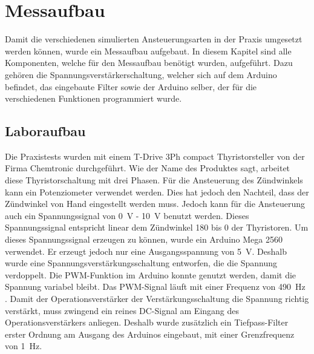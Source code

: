 \section{Messaufbau}
Damit die verschiedenen simulierten Ansteuerungsarten in der Praxis umgesetzt werden können, wurde ein Messaufbau aufgebaut. In diesem Kapitel sind alle Komponenten, welche für den Messaufbau benötigt wurden, aufgeführt. Dazu gehören die Spannungsverstärkerschaltung, welcher sich auf dem Arduino befindet, das eingebaute Filter sowie der Arduino selber, der für die verschiedenen Funktionen programmiert wurde.
\subsection{Laboraufbau}
Die Praxistests wurden mit einem \grqq T-Drive 3Ph compact Thyristorsteller\grqq \hspace{0.02cm} von der Firma Chemtronic durchgeführt. Wie der Name des Produktes sagt, arbeitet diese Thyristorschaltung mit drei Phasen. Für die Ansteuerung des Zündwinkels kann ein Potenziometer verwendet werden. Dies hat jedoch den Nachteil, dass der Zündwinkel von Hand eingestellt werden muss. Jedoch kann für die Ansteuerung auch ein Spannungssignal von \SI{0}{V} - \SI{10}{V} benutzt werden. Dieses Spannungssignal entspricht linear dem Zündwinkel 180\textdegree \hspace{0.02cm} bis 0\textdegree \hspace{0.02cm} der Thyristoren. Um dieses Spannungssignal erzeugen zu können, wurde ein Arduino Mega 2560 verwendet. Er erzeugt jedoch nur eine Ausgangsspannung von \SI{5}{V}. Deshalb wurde eine Spannungsverstärkungsschaltung entworfen, die die Spannung verdoppelt. Die PWM-Funktion im Arduino konnte genutzt werden, damit die Spannung variabel bleibt. Das PWM-Signal läuft mit einer Frequenz von \SI{490}{Hz} \cite{Arduino_PWM}. 
Damit der Operationsverstärker der Verstärkungsschaltung die Spannung richtig verstärkt, muss zwingend ein reines DC-Signal am Eingang des Operationsverstärkers anliegen. Deshalb wurde zusätzlich ein Tiefpass-Filter erster Ordnung am Ausgang des Arduinos eingebaut, mit einer Grenzfrequenz von \SI{1}{Hz}.  



